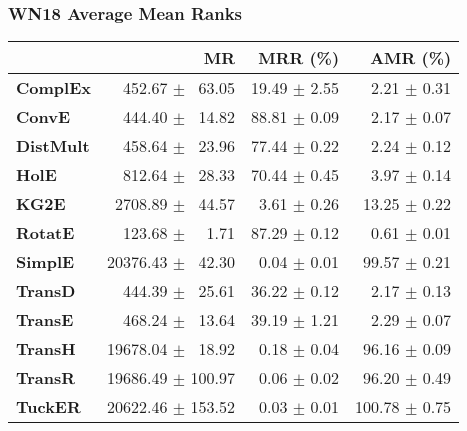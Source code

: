 \documentclass{article}
\begin{document}
\subsubsection{WN18 Average Mean Ranks}
    \begin{center}
    \begin{tabular}{lrrr}
\toprule
{} &                 MR &      MRR (\%) &       AMR (\%) \\
\midrule
\textbf{ComplEx } &  $\phantom{5}$$\phantom{5}$452.67 $\pm$ $\phantom{5}$63.05 &  19.49 $\pm$ 2.55 &  $\phantom{5}$$\phantom{5}$2.21 $\pm$ 0.31 \\
\textbf{ConvE   } &  $\phantom{5}$$\phantom{5}$444.40 $\pm$ $\phantom{5}$14.82 &  88.81 $\pm$ 0.09 &  $\phantom{5}$$\phantom{5}$2.17 $\pm$ 0.07 \\
\textbf{DistMult} &  $\phantom{5}$$\phantom{5}$458.64 $\pm$ $\phantom{5}$23.96 &  77.44 $\pm$ 0.22 &  $\phantom{5}$$\phantom{5}$2.24 $\pm$ 0.12 \\
\textbf{HolE    } &  $\phantom{5}$$\phantom{5}$812.64 $\pm$ $\phantom{5}$28.33 &  70.44 $\pm$ 0.45 &  $\phantom{5}$$\phantom{5}$3.97 $\pm$ 0.14 \\
\textbf{KG2E    } &  $\phantom{5}$2708.89 $\pm$ $\phantom{5}$44.57 &  $\phantom{5}$3.61 $\pm$ 0.26 &  $\phantom{5}$13.25 $\pm$ 0.22 \\
\textbf{RotatE  } &  $\phantom{5}$$\phantom{5}$123.68 $\pm$ $\phantom{5}$$\phantom{5}$1.71 &  87.29 $\pm$ 0.12 &  $\phantom{5}$$\phantom{5}$0.61 $\pm$ 0.01 \\
\textbf{SimplE  } &  20376.43 $\pm$ $\phantom{5}$42.30 &  $\phantom{5}$0.04 $\pm$ 0.01 &  $\phantom{5}$99.57 $\pm$ 0.21 \\
\textbf{TransD  } &  $\phantom{5}$$\phantom{5}$444.39 $\pm$ $\phantom{5}$25.61 &  36.22 $\pm$ 0.12 &  $\phantom{5}$$\phantom{5}$2.17 $\pm$ 0.13 \\
\textbf{TransE  } &  $\phantom{5}$$\phantom{5}$468.24 $\pm$ $\phantom{5}$13.64 &  39.19 $\pm$ 1.21 &  $\phantom{5}$$\phantom{5}$2.29 $\pm$ 0.07 \\
\textbf{TransH  } &  19678.04 $\pm$ $\phantom{5}$18.92 &  $\phantom{5}$0.18 $\pm$ 0.04 &  $\phantom{5}$96.16 $\pm$ 0.09 \\
\textbf{TransR  } &  19686.49 $\pm$ 100.97 &  $\phantom{5}$0.06 $\pm$ 0.02 &  $\phantom{5}$96.20 $\pm$ 0.49 \\
\textbf{TuckER  } &  20622.46 $\pm$ 153.52 &  $\phantom{5}$0.03 $\pm$ 0.01 &  100.78 $\pm$ 0.75 \\
\bottomrule
\end{tabular}

    \end{center}
\end{document}
